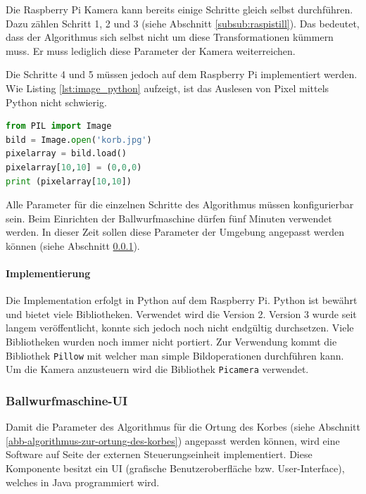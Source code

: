 Die Raspberry Pi Kamera kann bereits einige Schritte gleich selbst durchführen. Dazu zählen Schritt 1, 2 und 3 (siehe Abschnitt \ref{subsub:raspistill}). Das bedeutet, dass der Algorithmus sich selbst nicht um diese Transformationen kümmern muss. Er muss lediglich diese Parameter der Kamera weiterreichen.

Die Schritte 4 und 5 müssen jedoch auf dem Raspberry Pi implementiert werden. Wie Listing \ref{lst:image_python} aufzeigt, ist das Auslesen von Pixel mittels Python nicht schwierig.

\begin{lstlisting}[language=Python,caption={Pixel aus einem Bild auslesen mit Python},label=lst:image_python]
from PIL import Image
bild = Image.open('korb.jpg')
pixelarray = bild.load()
pixelarray[10,10] = (0,0,0)
print (pixelarray[10,10])
\end{lstlisting}

Alle Parameter für die einzelnen Schritte des Algorithmus müssen konfigurierbar sein. Beim Einrichten der Ballwurfmaschine dürfen fünf Minuten verwendet werden. In dieser Zeit sollen diese Parameter der Umgebung angepasst werden können (siehe Abschnitt \ref{ss-config-paramater-ortung-orb}).

\paragraph{Implementierung}
Die Implementation erfolgt in Python auf dem Raspberry Pi. Python ist bewährt und bietet viele Bibliotheken. Verwendet wird die Version 2. Version 3 wurde seit langem veröffentlicht, konnte sich jedoch noch nicht endgültig durchsetzen. Viele Bibliotheken wurden noch immer nicht portiert. Zur Verwendung kommt die Bibliothek \verb|Pillow| mit welcher man simple Bildoperationen durchführen kann. Um die Kamera anzusteuern wird die Bibliothek \verb|Picamera| verwendet.

\subsubsection{Ballwurfmaschine-UI}
\label{ss-config-paramater-ortung-orb}
Damit die Parameter des Algorithmus für die Ortung des Korbes (siehe Abschnitt \ref{abb-algorithmus-zur-ortung-des-korbes}) angepasst werden können, wird eine Software auf Seite der externen Steuerungseinheit implementiert. Diese Komponente besitzt ein UI (grafische Benutzeroberfläche bzw. User-Interface), welches in Java programmiert wird.

